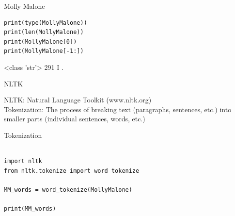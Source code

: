 \documentclass[handout]{beamer}
\begin{document}
\begin{frame}[fragile]{Molly Malone}
	
\begin{lstlisting}
print(type(MollyMalone))
print(len(MollyMalone))
print(MollyMalone[0])
print(MollyMalone[-1:])
\end{lstlisting}
	
\begin{lstlistingoutput}
<class 'str'>
291
I
.
\end{lstlistingoutput}

\end{frame}



\begin{frame}[fragile]{NLTK}
	

NLTK: Natural Language Toolkit (www.nltk.org) \\

Tokenization: The process of breaking text (paragraphs, sentences, etc.) into smaller parts (individual sentences, words, etc.)


\end{frame}



\begin{frame}[fragile]{Tokenization}
	
\begin{lstlisting}		

import nltk
from nltk.tokenize import word_tokenize

MM_words = word_tokenize(MollyMalone)

print(MM_words)
\end{lstlisting}
	
\begin{lstlistingoutput}
\end{lstlistingoutput}


\end{frame}
\end{document}

